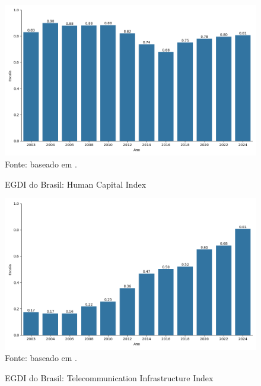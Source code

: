 \begin{figure}[H]
    \centering
    \caption{EGDI do Brasil: Human Capital Index}
    \includegraphics[width=1\linewidth]{figuras/egdi/egdi_brasil_hci.png}
    \label{fig:egdi_brasil_hci}
    \footnotesize{Fonte: baseado em \cite{ONU_edgi_mapa}.}
\end{figure}

\begin{figure}[H]
    \centering
    \caption{EGDI do Brasil: Telecommunication Infrastructure Index}
    \includegraphics[width=1\linewidth]{figuras/egdi/egdi_brasil_tsi.png}
    \label{fig:egdi_brasil_tsi}
    \footnotesize{Fonte: baseado em \cite{ONU_edgi_mapa}.}
\end{figure}